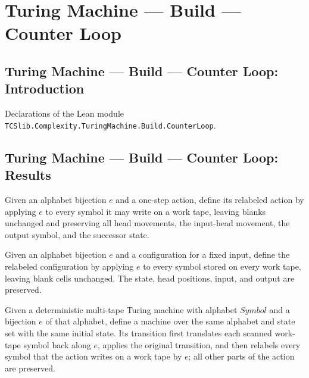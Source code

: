 \section{Turing Machine --- Build --- Counter Loop}
\subsection*{Turing Machine --- Build --- Counter Loop: Introduction}

Declarations of the Lean module \texttt{TCSlib.Complexity.TuringMachine.Build.CounterLoop}.

\subsection*{Turing Machine --- Build --- Counter Loop: Results}

\begin{definition}
\label{Turing.Action.mapWorkSymbols}
\leanok
{}
Given an alphabet bijection $e$ and a one-step action, define its relabeled action by
applying $e$ to every symbol it may write on a work tape, leaving blanks unchanged and
preserving all head movements, the input-head movement, the output symbol, and the
successor state.
\end{definition}

\begin{definition}
\label{Turing.Cfg.mapWorkSymbols}
\leanok
{}
Given an alphabet bijection $e$ and a configuration for a fixed input, define the
relabeled configuration by applying $e$ to every symbol stored on every work tape,
leaving blank cells unchanged. The state, head positions, input, and output are
preserved.
\end{definition}

\begin{definition}
\label{Turing.MultiTapeTM.mapWorkSymbols}
\leanok
{}
Given a deterministic multi-tape Turing machine with alphabet $Symbol$ and a
bijection $e$ of that alphabet, define a machine over the same alphabet and state set
with the same initial state. Its transition first translates each scanned work-tape
symbol back along $e$, applies the original transition, and then relabels every symbol
that the action writes on a work tape by $e$; all other parts of the action are
preserved.
\end{definition}

